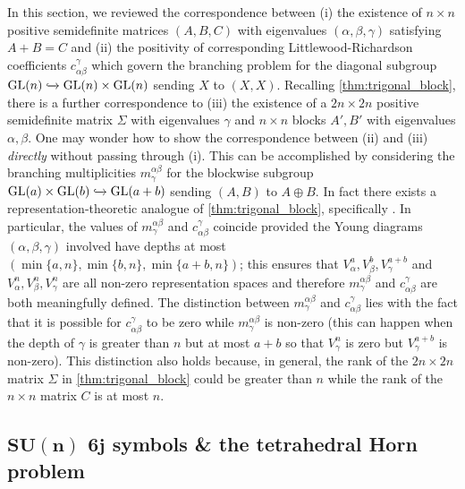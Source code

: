 \documentclass[notitlepage, 10pt]{article}
\begin{document}
\begin{rem}
    In this section, we reviewed the correspondence between (i) the existence of $n\times n$ positive semidefinite matrices $(A,B,C)$ with eigenvalues $(\alpha,\beta,\gamma)$ satisfying $A+B=C$ and (ii) the positivity of corresponding Littlewood-Richardson coefficients $c_{\alpha\beta}^{\gamma}$ which govern the branching problem for the diagonal subgroup $\operatorname{GL}(n) \xhookrightarrow{} \operatorname{GL}(n) \times \operatorname{GL}(n)$ sending $X$ to $(X,X)$.
    Recalling \cref{thm:trigonal_block}, there is a further correspondence to (iii) the existence of a $2n \times 2n$ positive semidefinite matrix $\Sigma$ with eigenvalues $\gamma$ and $n\times n$ blocks $A',B'$ with eigenvalues $\alpha,\beta$.
    One may wonder how to show the correspondence between (ii) and (iii) \textit{directly} without passing through (i).
    This can be accomplished by considering the branching multiplicities $m^{\alpha\beta}_{\gamma}$ for the blockwise subgroup $\operatorname{GL}(a) \times \operatorname{GL}(b) \xhookrightarrow{} \operatorname{GL}(a+b)$ sending $(A,B)$ to $A\oplus B$.
    In fact there exists a representation-theoretic analogue of \cref{thm:trigonal_block}, specifically \cite[Theorem 9.2.3]{goodman2000representations}.
    In particular, the values of $m^{\alpha\beta}_{\gamma}$ and $c_{\alpha\beta}^{\gamma}$ coincide provided the Young diagrams $(\alpha,\beta,\gamma)$ involved have depths at most $(\min\{a,n\}, \min\{b,n\}, \min\{a+b,n\})$; this ensures that $V_{\alpha}^{a}, V_{\beta}^{b}, V_{\gamma}^{a+b}$ and $V_{\alpha}^{n}, V_{\beta}^{n}, V_{\gamma}^{n}$ are all non-zero representation spaces and therefore $m^{\alpha\beta}_{\gamma}$ and $c_{\alpha\beta}^{\gamma}$ are both meaningfully defined.
    The distinction between $m^{\alpha\beta}_{\gamma}$ and $c_{\alpha\beta}^{\gamma}$ lies with the fact that it is possible for $c_{\alpha\beta}^{\gamma}$ to be zero while $m^{\alpha\beta}_{\gamma}$ is non-zero (this can happen when the depth of $\gamma$ is greater than $n$ but at most $a+b$ so that $V_{\gamma}^{n}$ is zero but $V_{\gamma}^{a+b}$ is non-zero).
    This distinction also holds because, in general, the rank of the $2n\times 2n$ matrix $\Sigma$ in \cref{thm:trigonal_block} could be greater than $n$ while the rank of the $n\times n$ matrix $C$ is at most $n$.
\end{rem}

\clearpage
\subsection{\texorpdfstring{$\boldsymbol{SU(n)}$ $\boldsymbol{6j}$}{SU(n) 6j} symbols \& the tetrahedral Horn problem}
\label{sec:sixj_symbols_tetrahedral}
\end{document}
